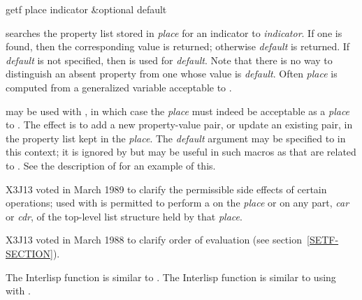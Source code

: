 \begin{defun}[Function]
getf place indicator &optional default

 searches the property list stored in {\it place}
for an indicator  to {\it indicator}.
If one is found, then the corresponding value is returned;
otherwise {\it default} is returned.  If {\it default} is not specified,
then {\false} is used for {\it default}.
Note that there is no way to distinguish an absent property from
one whose value is {\it default}.
Often {\it place} is computed from
a generalized variable acceptable to .

 may be used with , in which case the {\it place} must
indeed be acceptable as a {\it place} to .  The effect is to
add a new property-value pair, or update an existing pair,
in the property list kept in the {\it place}.
The {\it default} argument may be
specified to  in this context; it is ignored by  but
may be useful in such macros as  that are related to .
See the description of  for an example of this.

\begin{newer}
X3J13 voted in March 1989 
to clarify the permissible side effects of certain operations;
 used with  is permitted to perform a 
on the {\it place} or on any part, {\it car} or {\it cdr}, of the
top-level list structure held by that {\it place}.
\end{newer}

\begin{newer}
X3J13 voted in March 1988 
to clarify order of evaluation (see section~\ref{SETF-SECTION}).
\end{newer}

\beforenoterule
\begin{incompatibility}
The Interlisp function  is similar to .
The Interlisp function  is similar to using 
with .
\end{incompatibility}
\afternoterule
\end{defun}

